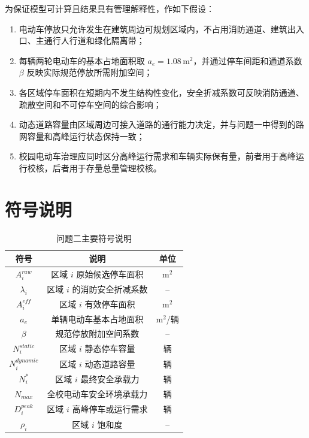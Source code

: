 \documentclass[UTF8,zihao=-4,a4paper]{ctexart}
\begin{document}
为保证模型可计算且结果具有管理解释性，作如下假设：
\begin{enumerate}
    \item 电动车停放只允许发生在建筑周边可规划区域内，不占用消防通道、建筑出入口、主通行人行道和绿化隔离带；
    \item 每辆两轮电动车的基本占地面积取 $a_e=1.08\,\text{m}^2$，并通过停车间距和通道系数 $\beta$ 反映实际规范停放所需附加空间；
    \item 各区域停车面积在短期内不发生结构性变化，安全折减系数可反映消防通道、疏散空间和不可停车空间的综合影响；
    \item 动态道路容量由区域周边可接入道路的通行能力决定，并与问题一中得到的路网容量和高峰运行状态保持一致；
    \item 校园电动车治理应同时区分高峰运行需求和车辆实际保有量，前者用于高峰运行校核，后者用于存量总量管理校核。
\end{enumerate}

\section{符号说明}

\begin{table}[H]
\centering
\caption{问题二主要符号说明}
\label{tab:symbols_q2}
\begin{tabular}{ccc}
\toprule
\textbf{符号} & \textbf{说明} & \textbf{单位} \\
\midrule
$A_i^{raw}$ & 区域 $i$ 原始候选停车面积 & $\text{m}^2$ \\
$\lambda_i$ & 区域 $i$ 的消防安全折减系数 & -- \\
$A_i^{eff}$ & 区域 $i$ 有效停车面积 & $\text{m}^2$ \\
$a_e$ & 单辆电动车基本占地面积 & $\text{m}^2$/辆 \\
$\beta$ & 规范停放附加空间系数 & -- \\
$N_i^{static}$ & 区域 $i$ 静态停车容量 & 辆 \\
$N_i^{dynamic}$ & 区域 $i$ 动态道路容量 & 辆 \\
$N_i^*$ & 区域 $i$ 最终安全承载力 & 辆 \\
$N_{max}$ & 全校电动车安全环境承载力 & 辆 \\
$D_i^{peak}$ & 区域 $i$ 高峰停车或运行需求 & 辆 \\
$\rho_i$ & 区域 $i$ 饱和度 & -- \\
\bottomrule
\end{tabular}
\end{table}
\end{document}
